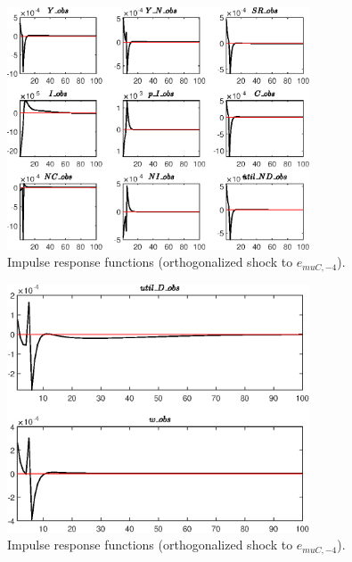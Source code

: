 \begin{figure}[H]
\centering 
\includegraphics[width=0.80\textwidth]{RBC_sectoral/graphs/RBC_sectoral_IRF_e_muC_news1}
\caption{Impulse response functions (orthogonalized shock to ${e_{muC,-4}}$).}\label{Fig:IRF:e_muC_news:1}
\end{figure}
 
\begin{figure}[H]
\centering 
\includegraphics[width=0.80\textwidth]{RBC_sectoral/graphs/RBC_sectoral_IRF_e_muC_news2}
\caption{Impulse response functions (orthogonalized shock to ${e_{muC,-4}}$).}\label{Fig:IRF:e_muC_news:2}
\end{figure}
 
